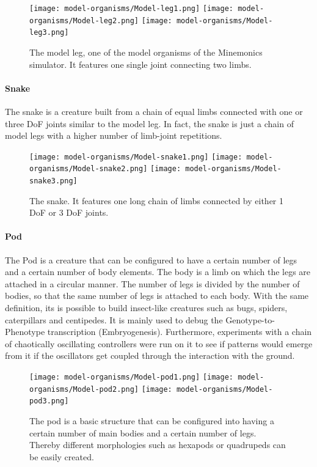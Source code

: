 \documentclass[main]{subfiles}
\begin{document}
\begin{figure}[H]
\centering
\texttt{[image: model-organisms/Model-leg1.png]}
\texttt{[image: model-organisms/Model-leg2.png]}
\texttt{[image: model-organisms/Model-leg3.png]}
\caption[The model leg]{The model leg, one of the model organisms of the Minemonics simulator. It features one single joint connecting two limbs.}
\label{figure:model-leg}
\end{figure}

\paragraph{Snake}

The snake is a creature built from a chain of equal limbs connected with one or three DoF joints similar to the model leg. %
%
In fact, the snake is just a chain of model legs with a higher number of limb-joint repetitions. 

\begin{figure}[H]
\centering
\texttt{[image: model-organisms/Model-snake1.png]}
\texttt{[image: model-organisms/Model-snake2.png]}
\texttt{[image: model-organisms/Model-snake3.png]}
\caption[The snake]{The snake. It features one long chain of limbs connected by either 1 DoF or 3 DoF joints.}
\label{figure:snake}
\end{figure}

\paragraph{Pod}

The Pod is a creature that can be configured to have a certain number of legs and a certain number of body elements. %
%
The body is a limb on which the legs are attached in a circular manner. %
%
The number of legs is divided by the number of bodies, so that the same number of legs is attached to each body. %
%
With the same definition, its is possible to build insect-like creatures such as bugs, spiders, caterpillars and centipedes. %
%
It is mainly used to debug the Genotype-to-Phenotype transcription (Embryogenesis). %
%
Furthermore, experiments with a chain of chaotically oscillating controllers were run on it to see if patterns would emerge from it if the oscillators get coupled through the interaction with the ground.

\begin{figure}[H]
\centering
\texttt{[image: model-organisms/Model-pod1.png]}
\texttt{[image: model-organisms/Model-pod2.png]}
\texttt{[image: model-organisms/Model-pod3.png]}
\caption[The pod]{The pod is a basic structure that can be configured into having a certain number of main bodies and a certain number of legs. Thereby different morphologies such as hexapods or quadrupeds can be easily created.}
\label{figure:pod}
\end{figure}
\end{document}

